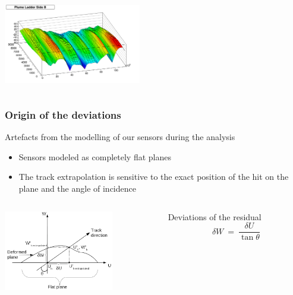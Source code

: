 \documentclass{beamer}
\begin{document}
\begin{frame}
\begin{columns}[c]
    \begin{column}{6cm}
      \begin{center}
        \includegraphics[width = 6cm]{Pictures/SideBPlumeLadder2010_M20.png}
      \end{center}
    \end{column}
  \end{columns}

\end{frame}

\begin{frame}
  \frametitle{Origin of the deviations}
  
  \begin{block}{Artefacts from the modelling of our sensors during the analysis}
    \begin{itemize}
      \item Sensors modeled as completely flat planes
      \item The track extrapolation is sensitive to the exact position of the hit on the plane and the angle of incidence
    \end{itemize}
  \end{block}

  \begin{columns}[c]
    \begin{column}{5cm}
      \vspace{-0.2cm}
      \begin{center}
        \includegraphics[width = 4.8cm]{Pictures/origin_deformation.png}
      \end{center}
    \end{column}

    \begin{column}{5cm}
      \begin{alertblock}{Deviations of the residual}
        \[ \delta W \ = \ \frac{\delta U}{\tan \theta}\]
      \end{alertblock}
    \end{column}
  \end{columns}

\end{frame}
\end{document}
